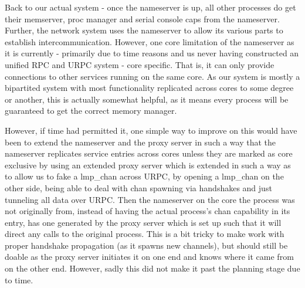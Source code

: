 \medskip
Back to our actual system - once the nameserver is up, all other processes do get their memserver, proc manager and serial console caps from the nameserver. Further, the network system uses the nameserver to allow its various parts to establish intercommunication.
However, one core limitation of the nameserver as it is currently - primarily due to time reasons and us never having constructed an unified RPC and URPC system - core specific. That is, it can only provide connections to other services running on the same core. As our system is mostly a bipartited system with most functionality replicated across cores to some degree or another, this is actually somewhat helpful, as it means every process will be guaranteed to get the correct memory manager.

\medskip
However, if time had permitted it, one simple way to improve on this would have been to extend the nameserver and the proxy server in such a way that the nameserver replicates service entries across cores unless they are marked as core exclusive by using an extended proxy server which is extended in such a way as to allow us to fake a lmp\_chan across URPC, by opening a lmp\_chan on the other side, being able to deal with chan spawning via handshakes and just tunneling all data over URPC. Then the nameserver on the core the process was not originally from, instead of having the actual process's chan capability in its entry, has one generated by the proxy server which is set up such that it will direct any calls to the original process.
This is a bit tricky to make work with proper handshake propagation (as it spawns new channels), but should still be doable as the proxy server initiates it on one end and knows where it came from on the other end.
However, sadly this did not make it past the planning stage due to time.

